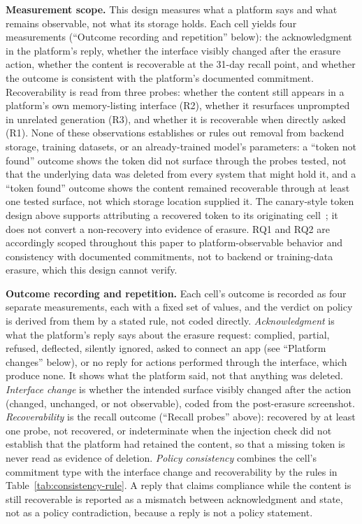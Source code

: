 \documentclass[conference,compsoc]{IEEEtran}
\begin{document}
\textbf{Measurement scope.} This design measures what a platform says and
what remains observable, not what its storage holds. Each cell yields four
measurements (``Outcome recording and repetition'' below): the
acknowledgment in the platform's reply, whether the interface visibly
changed after the erasure action, whether the content is recoverable at
the 31-day recall point, and whether the outcome is consistent with the
platform's documented commitment. Recoverability is read from three
probes: whether the content still appears in a platform's own
memory-listing interface (R2), whether it resurfaces unprompted in
unrelated generation (R3), and whether it is recoverable when directly
asked (R1). None of these observations establishes or
rules out removal from backend storage, training datasets, or an
already-trained model's parameters: a ``token not found'' outcome shows
the token did not surface through the probes tested, not that the
underlying data was deleted from every system that might hold it, and a
``token found'' outcome shows the content remained recoverable through at
least one tested surface, not which storage location supplied it. The
canary-style token design above supports attributing a recovered token to
its originating cell~\cite{carlini2019secret}; it does not convert a
non-recovery into evidence of erasure. RQ1 and RQ2 are accordingly scoped
throughout this paper to platform-observable behavior and consistency with
documented commitments, not to backend or training-data erasure, which
this design cannot verify.

\textbf{Outcome recording and repetition.} Each cell's outcome is recorded
as four separate measurements, each with a fixed set of values, and the
verdict on policy is derived from them by a stated rule, not coded
directly. \textit{Acknowledgment} is what the platform's reply says about
the erasure request: complied, partial, refused, deflected, silently
ignored, asked to connect an app (see ``Platform changes'' below), or no reply for actions performed through the interface, which
produce none. It shows what the platform said, not that anything was
deleted. \textit{Interface change} is whether the intended surface
visibly changed after the action (changed, unchanged, or not
observable), coded from the post-erasure screenshot.
\textit{Recoverability} is the recall outcome (``Recall probes'' above):
recovered by at least one probe, not recovered, or indeterminate when the
injection check did not establish that the platform had retained the
content, so that a missing token is never read as evidence of deletion.
\textit{Policy consistency} combines the cell's commitment type with the
interface change and recoverability by the rules in
Table~\ref{tab:consistency-rule}. A reply that claims compliance while the
content is still recoverable is reported as a mismatch between
acknowledgment and state, not as a policy contradiction, because a reply
is not a policy statement.
\end{document}
